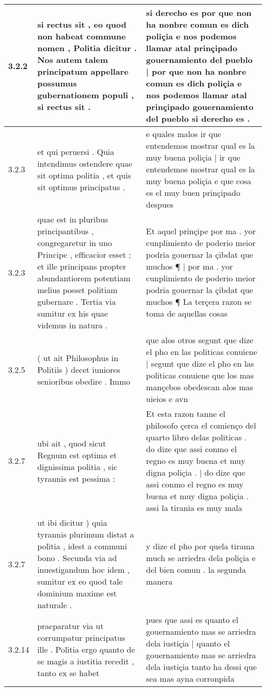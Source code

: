\begin{tabular}{|p{1cm}|p{6.5cm}|p{6.5cm}|}
3.2.2 & si rectus sit , eo quod non habeat commune nomen , Politia dicitur . Nos autem talem principatum appellare possumus gubernationem populi , si rectus sit . & si derecho es por que non ha nonbre comun es dich poliçia e nos podemos llamar atal prinçipado gouernamiento del pueblo | por que non ha nonbre comun es dich poliçia e nos podemos llamar atal prinçipado gouernamiento del pueblo si derecho es . \\\hline
3.2.3 & et qui peruersi . Quia intendimus ostendere quae sit optima politia , et quis sit optimus principatus . & e quales malos ir que entendemos mostrar qual es la muy buena poliçia | ir que entendemos mostrar qual es la muy buena poliçia e que cosa es el muy buen prinçipado despues \\\hline
3.2.3 & quae est in pluribus principantibus , congregaretur in uno Principe , efficacior esset ; et ille principans propter abundantiorem potentiam melius posset politiam gubernare . Tertia via sumitur ex his quae videmus in natura . & Et aquel prinçipe por ma . yor cunplimiento de poderio meior podria gouernar la çibdat que muchos ¶ | por ma . yor cunplimiento de poderio meior podria gouernar la çibdat que muchos ¶ La terçera razon se toma de aquellas cosas \\\hline
3.2.5 & ( ut ait Philosophus in Politiis ) decet iuniores senioribus obedire . Immo & que alos otros segunt que dize el pho en las politicas conuiene | segunt que dize el pho en las politicas conuiene que los mas mançebos obedescan alos mas uieios e avn \\\hline
3.2.7 & ubi ait , quod sicut Regnum est optima et dignissima politia , sic tyrannis est pessima : & Et esta razon tanne el philosofo çerca el comienço del quarto libro delas politicas . do dize que assi conmo el regno es muy buena et muy digna poliçia . | do dize que assi conmo el regno es muy buena et muy digna poliçia . assi la tirania es muy mala \\\hline
3.2.7 & ut ibi dicitur ) quia tyrannis plurimum distat a politia , idest a communi bono . Secunda via ad inuestigandum hoc idem , sumitur ex eo quod tale dominium maxime est naturale . & y dize el pho por quela tirama much se arriedra dela poliçia e del bien comun . la segunda manera \\\hline
3.2.14 & praeparatur via ut corrumpatur principatus ille . Politia ergo quanto de se magis a iustitia recedit , tanto ex se habet & pues que assi es quanto el gouernamiento mas se arriedra dela iustiçia | quanto el gouernamiento mas se arriedra dela iustiçia tanto ha dessi que sea mas ayna corronpida \\\hline

\end{tabular}
